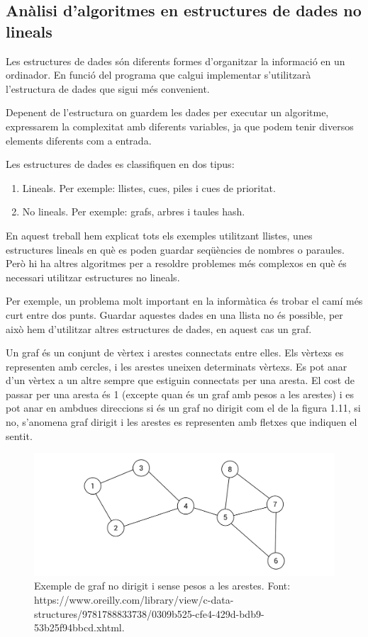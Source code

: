 \subsection{Anàlisi d'algoritmes en estructures de dades no lineals}
Les estructures de dades són diferents formes d'organitzar la informació en un ordinador. En funció del programa que calgui implementar s'utilitzarà l'estructura de dades que sigui més convenient.

Depenent de l'estructura on guardem les dades per executar un algoritme, expressarem la complexitat amb diferents variables, ja que podem tenir diversos elements diferents com a entrada.

Les estructures de dades es classifiquen en dos tipus:
\begin{enumerate}
    \item Lineals. Per exemple: llistes, cues, piles i cues de prioritat.
    \item No lineals. Per exemple: grafs, arbres i taules hash.
\end{enumerate}

En aquest treball hem explicat tots els exemples utilitzant llistes, unes estructures lineals en què es poden guardar seqüències de nombres o paraules. Però hi ha altres algoritmes per a resoldre problemes més complexos en què és necessari utilitzar estructures no lineals. 

Per exemple, un problema molt important en la informàtica és trobar el camí més curt entre dos punts. Guardar aquestes dades en una llista no és possible, per això hem d'utilitzar altres estructures de dades, en aquest cas un graf.

Un graf és un conjunt de vèrtex i arestes connectats entre elles. Els vèrtexs es representen amb cercles, i les arestes uneixen determinats vèrtexs. Es pot anar d'un vèrtex a un altre sempre que estiguin connectats per una aresta. El cost de passar per una aresta és 1 (excepte quan és un graf amb pesos a les arestes) i es pot anar en ambdues direccions si és un graf no dirigit com el de la figura 1.11, si no, s'anomena graf dirigit i les arestes es representen amb fletxes que indiquen el sentit.
\vspace{18pt}
\begin{figure}[H]
    \centering
    \includegraphics[width=.85\textwidth]{capitols/figures/7.png}
    \caption[Exemple de graf no dirigit i sense pesos a les arestes.]{Exemple de graf no dirigit i sense pesos a les arestes. Font: \\ https://www.oreilly.com/library/view/c-data-structures/9781788833738/0309b525-cfe4-429d-bdb9-53b25f94bbcd.xhtml.}
    \label{Figura}
\end{figure}

